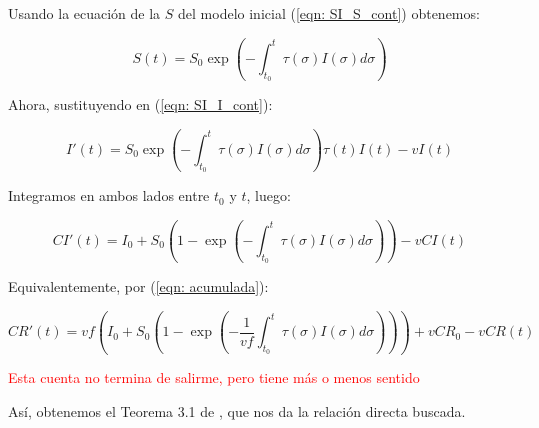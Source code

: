 Usando la ecuación de la $S$ del modelo inicial (\ref{eqn: SI_S_cont}) obtenemos:

$$S(t) = S_0 \exp{\left( - \int_{t_0}^t \tau(\sigma ) I(\sigma ) d\sigma \right) } $$ 

Ahora, sustituyendo en (\ref{eqn: SI_I_cont}):

$$I'(t) = S_0 \exp{\left( - \int_{t_0}^t \tau(\sigma ) I(\sigma ) d\sigma \right) } \tau (t) I(t) -vI(t) $$

Integramos en ambos lados entre $t_0$ y $t$, luego:

$$ CI'(t) = I_0 + S_0 \left( 1-\exp{\left(- \int_{t_0}^t \tau (\sigma ) I(\sigma )d\sigma \right)}\right) -vCI(t)$$

Equivalentemente, por (\ref{eqn: acumulada}):

$$CR'(t) = vf\left( I_0 + S_0 \left( 1-\exp{\left(- \frac{1}{vf}\int_{t_0}^t \tau (\sigma ) I(\sigma )d\sigma \right)}\right)\right) +vCR_0 -vCR(t)$$

\textcolor{red}{Esta cuenta no termina de salirme, pero tiene más o menos sentido}

Así, obtenemos el Teorema 3.1 de \cite{demongeotSIEpidemicModel}, que nos da la relación directa buscada.







